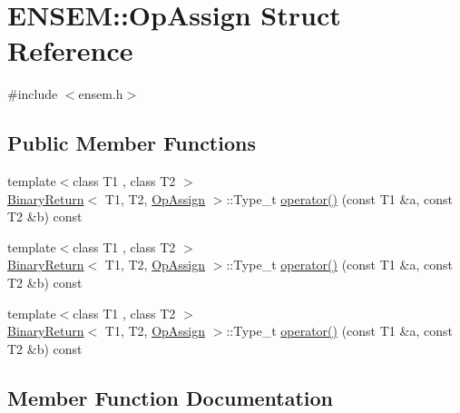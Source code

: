 \hypertarget{structENSEM_1_1OpAssign}{}\section{E\+N\+S\+EM\+:\+:Op\+Assign Struct Reference}
\label{structENSEM_1_1OpAssign}


{\ttfamily \#include $<$ensem.\+h$>$}

\subsection*{Public Member Functions}
\begin{DoxyCompactItemize}
\item 
{\footnotesize template$<$class T1 , class T2 $>$ }\\\mbox{\hyperlink{structENSEM_1_1BinaryReturn}{Binary\+Return}}$<$ T1, T2, \mbox{\hyperlink{structENSEM_1_1OpAssign}{Op\+Assign}} $>$\+::Type\+\_\+t \mbox{\hyperlink{structENSEM_1_1OpAssign_aaab39b3bd0c80dac6b56a48970ff388a}{operator()}} (const T1 \&a, const T2 \&b) const
\item 
{\footnotesize template$<$class T1 , class T2 $>$ }\\\mbox{\hyperlink{structENSEM_1_1BinaryReturn}{Binary\+Return}}$<$ T1, T2, \mbox{\hyperlink{structENSEM_1_1OpAssign}{Op\+Assign}} $>$\+::Type\+\_\+t \mbox{\hyperlink{structENSEM_1_1OpAssign_aaab39b3bd0c80dac6b56a48970ff388a}{operator()}} (const T1 \&a, const T2 \&b) const
\item 
{\footnotesize template$<$class T1 , class T2 $>$ }\\\mbox{\hyperlink{structENSEM_1_1BinaryReturn}{Binary\+Return}}$<$ T1, T2, \mbox{\hyperlink{structENSEM_1_1OpAssign}{Op\+Assign}} $>$\+::Type\+\_\+t \mbox{\hyperlink{structENSEM_1_1OpAssign_aaab39b3bd0c80dac6b56a48970ff388a}{operator()}} (const T1 \&a, const T2 \&b) const
\end{DoxyCompactItemize}


\subsection{Member Function Documentation}
\mbox{\label{structENSEM_1_1OpAssign_aaab39b3bd0c80dac6b56a48970ff388a}} 
